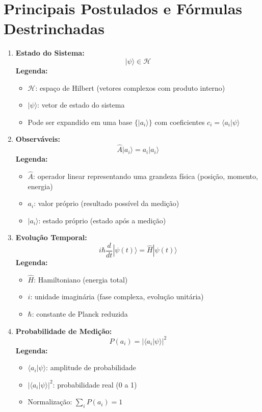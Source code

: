 \documentclass[a4paper,12pt]{article}
\begin{document}
\section*{Principais Postulados e Fórmulas Destrinchadas}
\begin{enumerate}
    \item \textbf{Estado do Sistema:} 
    \[ |\psi\rangle \in \mathcal{H} \]
    \textbf{Legenda:}
    \begin{itemize}
        \item $\mathcal{H}$: espaço de Hilbert (vetores complexos com produto interno)
        \item $|\psi\rangle$: vetor de estado do sistema
        \item Pode ser expandido em uma base $\{|a_i\rangle\}$ com coeficientes $c_i = \langle a_i|\psi\rangle$
    \end{itemize}
    
    \item \textbf{Observáveis:}
    \[ \hat{A} |a_i\rangle = a_i |a_i\rangle \]
    \textbf{Legenda:}
    \begin{itemize}
        \item $\hat{A}$: operador linear representando uma grandeza física (posição, momento, energia)
        \item $a_i$: valor próprio (resultado possível da medição)
        \item $|a_i\rangle$: estado próprio (estado após a medição)
    \end{itemize}
    
    \item \textbf{Evolução Temporal:} 
    \[ i\hbar \frac{d}{dt} |\psi(t)\rangle = \hat{H} |\psi(t)\rangle \]
    \textbf{Legenda:}
    \begin{itemize}
        \item $\hat{H}$: Hamiltoniano (energia total)
        \item $i$: unidade imaginária (fase complexa, evolução unitária)
        \item $\hbar$: constante de Planck reduzida
    \end{itemize}
    
    \item \textbf{Probabilidade de Medição:} 
    \[ P(a_i) = |\langle a_i | \psi \rangle|^2 \]
    \textbf{Legenda:}
    \begin{itemize}
        \item $\langle a_i|\psi\rangle$: amplitude de probabilidade
        \item $|\langle a_i|\psi\rangle|^2$: probabilidade real (0 a 1)
        \item Normalização: $\sum_i P(a_i) = 1$
    \end{itemize}
\end{enumerate}
\end{document}
